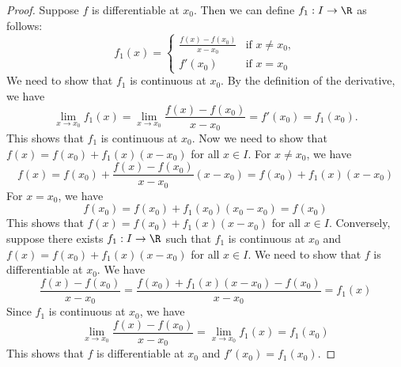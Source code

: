 \documentclass[openany]{book}
\begin{document}
\begin{proof}
    Suppose $f$ is differentiable at $x_0$. Then we can define $f_1: I \to \R$ as follows:
\[
    f_1(x) = \begin{cases}
        \frac{f(x) - f(x_0)}{x - x_0} & \text{if } x \neq x_0, \\
        f'(x_0) & \text{if } x = x_0
    \end{cases}
\]
We need to show that $f_1$ is continuous at $x_0$. By the definition of the derivative, we have
\[
    \lim_{x \to x_0} f_1(x) = \lim_{x \to x_0} \frac{f(x) - f(x_0)}{x - x_0} = f'(x_0) = f_1(x_0).
\]
This shows that $f_1$ is continuous at $x_0$.
Now we need to show that $f(x) = f(x_0) + f_1(x)(x - x_0)$ for all $x \in I$. For $x \neq x_0$, we have
\[
    f(x) = f(x_0) + \frac{f(x) - f(x_0)}{x - x_0}(x - x_0) = f(x_0) + f_1(x)(x - x_0)
\]
For $x = x_0$, we have
\[
    f(x_0) = f(x_0) + f_1(x_0)(x_0 - x_0) = f(x_0)
\]
This shows that $f(x) = f(x_0) + f_1(x)(x - x_0)$ for all $x \in I$.
Conversely, suppose there exists $f_1: I \to \R$ such that $f_1$ is continuous at $x_0$ and $f(x) = f(x_0) + f_1(x)(x - x_0)$ for all $x \in I$. We need to show that $f$ is differentiable at $x_0$. We have
\[
    \frac{f(x) - f(x_0)}{x - x_0} = \frac{f(x_0) + f_1(x)(x - x_0) - f(x_0)}{x - x_0} = f_1(x)
\]
Since $f_1$ is continuous at $x_0$, we have
\[
    \lim_{x \to x_0} \frac{f(x) - f(x_0)}{x - x_0} = \lim_{x \to x_0} f_1(x) = f_1(x_0)
\]
This shows that $f$ is differentiable at $x_0$ and $f'(x_0) = f_1(x_0)$.
\end{proof}
\end{document}
